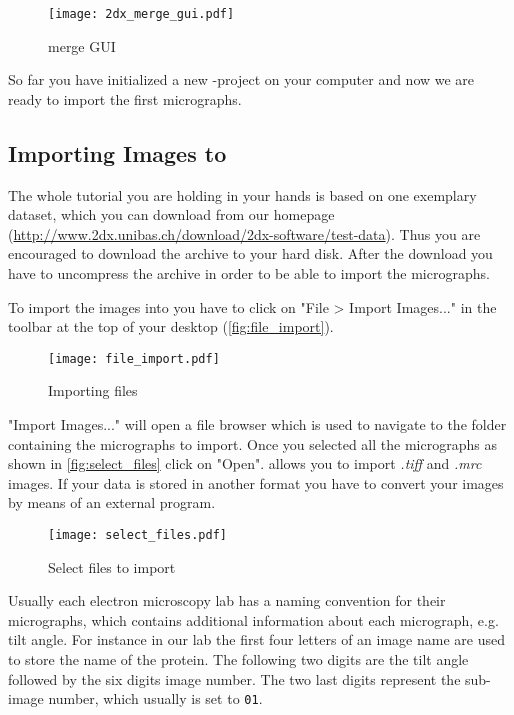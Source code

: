 \begin{figure}[H]
	\centering
	\texttt{[image: 2dx\_merge\_gui.pdf]}
	\caption{{\twodx} merge GUI}
	\label{fig:2dx_merge_gui}
\end{figure}

So far you have initialized a new {\twodx}-project on your computer and now we are ready to import the first micrographs.

\subsection{Importing Images to {\twodx}}
\label{sec:import}

The whole tutorial you are holding in your hands is based on one exemplary dataset, which you can download from our homepage (\url{http://www.2dx.unibas.ch/download/2dx-software/test-data}). Thus you are encouraged to download the archive to your hard disk. After the download you have to uncompress the archive in order to be able to import the micrographs. 

To import the images into {\twodx} you have to click on "File > Import Images..." in the toolbar at the top of your desktop (\autoref{fig:file_import}).

\begin{figure}[H]
	\centering
	\texttt{[image: file\_import.pdf]}
	\caption{Importing files}
	\label{fig:file_import}
\end{figure}

"Import Images..." will open a file browser which is used to navigate to the folder containing the micrographs to import. Once you selected all the micrographs as shown in \autoref{fig:select_files} click on "Open". {\twodx} allows you to import \textit{.tiff} and \textit{.mrc} images. If your data is stored in another format you have to convert your images by means of an external program.

\begin{figure}[H]
	\centering
	\texttt{[image: select\_files.pdf]}
	\caption{Select files to import}
	\label{fig:select_files}
\end{figure}

Usually each electron microscopy lab has a naming convention for their micrographs, which contains additional information about each micrograph, e.g. tilt angle. For instance in our lab the first four letters of an image name are used to store the name of the protein. The following two digits are the tilt angle followed by the six digits image number. The two last digits represent the sub-image number, which usually is set to \texttt{01}. 

